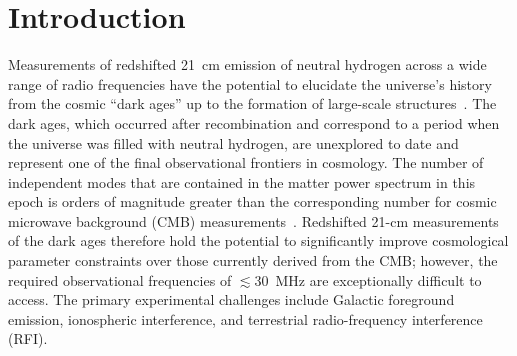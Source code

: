 \documentclass{ws-jai}
\begin{document}

\section{Introduction}

Measurements of redshifted \SI{21}{\cm} emission of neutral hydrogen
across a wide range of radio frequencies have the potential to
elucidate the universe's history from the cosmic ``dark ages'' up to
the formation of large-scale
structures~\citep[e.g.,][]{2012RPPh...75h6901P}.  The dark ages, which
occurred after recombination and correspond to a period when the
universe was filled with neutral hydrogen, are unexplored to date and
represent one of the final observational frontiers in cosmology.  The
number of independent modes that are contained in the matter power
spectrum in this epoch is orders of magnitude greater than the
corresponding number for cosmic microwave background (CMB)
measurements~\citep{2004PhRvL..92u1301L}.  Redshifted 21-cm
measurements of the dark ages therefore hold the potential to
significantly improve cosmological parameter constraints over those
currently derived from the CMB; however, the required observational
frequencies of $\lesssim 30$~MHz are exceptionally difficult to
access.  The primary experimental challenges include Galactic
foreground emission, ionospheric interference, and terrestrial
radio-frequency interference (RFI).
\end{document}
